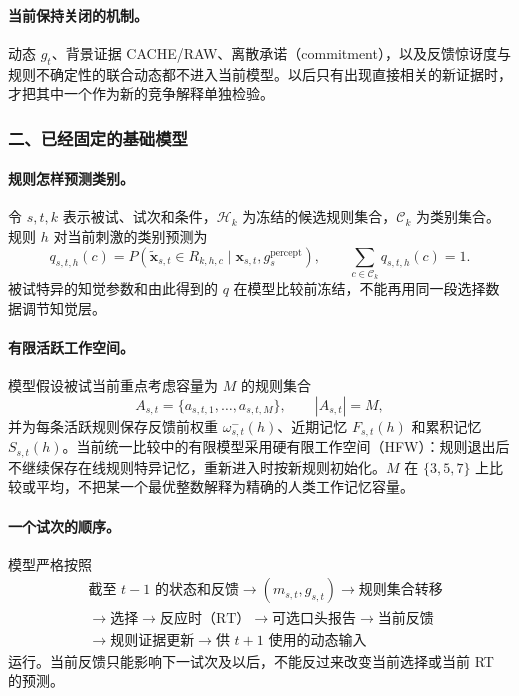 \paragraph{当前保持关闭的机制。}
动态 $g_t$、背景证据 CACHE/RAW、离散承诺（commitment），以及反馈惊讶度与规则不确定性的联合动态都不进入当前模型。以后只有出现直接相关的新证据时，才把其中一个作为新的竞争解释单独检验。


\subsubsection{二、已经固定的基础模型}

\paragraph{规则怎样预测类别。}
令 $s,t,k$ 表示被试、试次和条件，$\mathcal H_k$ 为冻结的候选规则集合，$\mathcal C_k$ 为类别集合。规则 $h$ 对当前刺激的类别预测为
\begin{equation}
q_{s,t,h}(c)
=P\!\left(\widetilde{\mathbf x}_{s,t}\in R_{k,h,c}
\mid \mathbf x_{s,t},g_s^{\mathrm{percept}}\right),
\qquad \sum_{c\in\mathcal C_k}q_{s,t,h}(c)=1.
\label{eq:model0806-rule-prediction}
\end{equation}
被试特异的知觉参数和由此得到的 $q$ 在模型比较前冻结，不能再用同一段选择数据调节知觉层。

\paragraph{有限活跃工作空间。}
模型假设被试当前重点考虑容量为 $M$ 的规则集合
\begin{equation}
A_{s,t}=\{a_{s,t,1},\ldots,a_{s,t,M}\},
\qquad |A_{s,t}|=M,
\end{equation}
并为每条活跃规则保存反馈前权重 $\omega^-_{s,t}(h)$、近期记忆 $F_{s,t}(h)$ 和累积记忆 $S_{s,t}(h)$。当前统一比较中的有限模型采用硬有限工作空间（HFW）：规则退出后不继续保存在线规则特异记忆，重新进入时按新规则初始化。$M$ 在 $\{3,5,7\}$ 上比较或平均，不把某一个最优整数解释为精确的人类工作记忆容量。

\paragraph{一个试次的顺序。}
模型严格按照
\begin{equation}
\begin{aligned}
&\text{截至 }t-1\text{ 的状态和反馈}
\longrightarrow (m_{s,t},g_{s,t})
\longrightarrow \text{规则集合转移}\\
&\longrightarrow \text{选择}
\longrightarrow \text{反应时（RT）}
\longrightarrow \text{可选口头报告}
\longrightarrow \text{当前反馈}\\
&\longrightarrow \text{规则证据更新}
\longrightarrow \text{供 }t+1\text{ 使用的动态输入}
\end{aligned}
\label{eq:model0806-trial-order}
\end{equation}
运行。当前反馈只能影响下一试次及以后，不能反过来改变当前选择或当前 RT 的预测。

